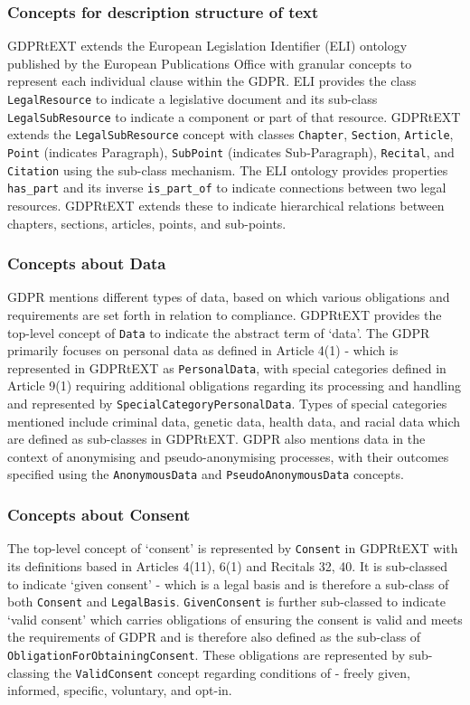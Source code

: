 \subsubsection{Concepts for description structure of text}
GDPRtEXT extends the European Legislation Identifier (ELI) \cite{} ontology published by the European Publications Office with granular concepts to represent each individual clause within the GDPR. 
ELI provides the class \texttt{LegalResource} to indicate a legislative document and its sub-class \texttt{LegalSubResource} to indicate a component or part of that resource. GDPRtEXT extends the \texttt{LegalSubResource} concept with classes \texttt{Chapter}, \texttt{Section}, \texttt{Article}, \texttt{Point} (indicates Paragraph), \texttt{SubPoint} (indicates Sub-Paragraph), \texttt{Recital}, and \texttt{Citation} using the sub-class mechanism.
The ELI ontology provides properties \texttt{has\_part} and its inverse \texttt{is\_part\_of} to indicate connections between two legal resources. GDPRtEXT extends these to indicate hierarchical relations between chapters, sections, articles, points, and sub-points.

\subsubsection{Concepts about Data}
GDPR mentions different types of data, based on which various obligations and requirements are set forth in relation to compliance. GDPRtEXT provides the top-level concept of \texttt{Data} to indicate the abstract term of `data'.
The GDPR primarily focuses on personal data as defined in Article 4(1) - which is represented in GDPRtEXT as \texttt{PersonalData}, with special categories defined in Article 9(1) requiring additional obligations regarding its processing and handling and represented by \texttt{SpecialCategoryPersonalData}. Types of special categories mentioned include criminal data, genetic data, health data, and racial data which are defined as sub-classes in GDPRtEXT.
GDPR also mentions data in the context of anonymising and pseudo-anonymising processes, with their outcomes specified using the \texttt{AnonymousData} and \texttt{PseudoAnonymousData} concepts.

\subsubsection{Concepts about Consent}
The top-level concept of `consent' is represented by \texttt{Consent} in GDPRtEXT with its definitions based in Articles 4(11), 6(1) and Recitals 32, 40. It is sub-classed to indicate `given consent' - which is a legal basis and is therefore a sub-class of both \texttt{Consent} and \texttt{LegalBasis}. \texttt{GivenConsent} is further sub-classed to indicate `valid consent' which carries obligations of ensuring the consent is valid and meets the requirements of GDPR and is therefore also defined as the sub-class of \texttt{ObligationForObtainingConsent}. These obligations are represented by sub-classing the \texttt{ValidConsent} concept regarding conditions of - freely given, informed, specific, voluntary, and opt-in.

